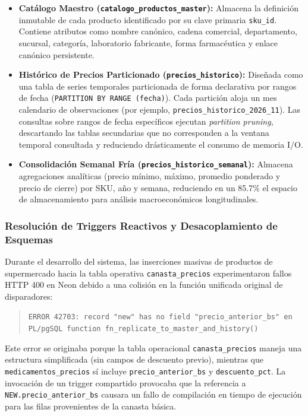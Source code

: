 \begin{itemize}[leftmargin=*]
    \item \textbf{Catálogo Maestro (\texttt{catalogo\_productos\_master}):} Almacena la definición inmutable de cada producto identificado por su clave primaria \texttt{sku\_id}. Contiene atributos como nombre canónico, cadena comercial, departamento, sucursal, categoría, laboratorio fabricante, forma farmacéutica y enlace canónico persistente.
    \item \textbf{Histórico de Precios Particionado (\texttt{precios\_historico}):} Diseñada como una tabla de series temporales particionada de forma declarativa por rangos de fecha (\texttt{PARTITION BY RANGE (fecha)}). Cada partición aloja un mes calendario de observaciones (por ejemplo, \texttt{precios\_historico\_2026\_11}). Las consultas sobre rangos de fecha específicos ejecutan \textit{partition pruning}, descartando las tablas secundarias que no corresponden a la ventana temporal consultada y reduciendo drásticamente el consumo de memoria I/O.
    \item \textbf{Consolidación Semanal Fría (\texttt{precios\_historico\_semanal}):} Almacena agregaciones analíticas (precio mínimo, máximo, promedio ponderado y precio de cierre) por SKU, año y semana, reduciendo en un 85.7\% el espacio de almacenamiento para análisis macroeconómicos longitudinales.
\end{itemize}

\subsubsection{Resolución de Triggers Reactivos y Desacoplamiento de Esquemas}
Durante el desarrollo del sistema, las inserciones masivas de productos de supermercado hacia la tabla operativa \texttt{canasta\_precios} experimentaron fallos HTTP 400 en Neon debido a una colisión en la función unificada original de disparadores:
\begin{quote}
    \footnotesize\texttt{ERROR 42703: record "new" has no field "precio\_anterior\_bs" en PL/pgSQL function fn\_replicate\_to\_master\_and\_history()}
\end{quote}

Este error se originaba porque la tabla operacional \texttt{canasta\_precios} maneja una estructura simplificada (sin campos de descuento previo), mientras que \texttt{medicamentos\_precios} sí incluye \texttt{precio\_anterior\_bs} y \texttt{descuento\_pct}. La invocación de un trigger compartido provocaba que la referencia a \texttt{NEW.precio\_anterior\_bs} causara un fallo de compilación en tiempo de ejecución para las filas provenientes de la canasta básica.

